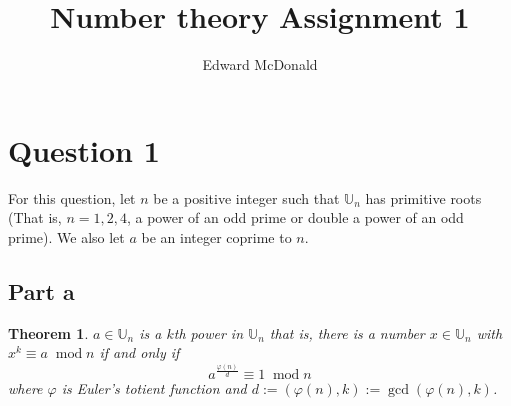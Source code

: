 \documentclass[10pt]{article}
\title{Number theory Assignment 1}
\author{Edward McDonald}
\date{}
\newtheorem{theorem}{Theorem}
\newcommand{\modulo}[1]{\;\operatorname{mod} #1}
\begin{document}
\maketitle{}
    \section*{Question 1}
    For this question, let $n$ be a positive integer such that $\mathbb{U}_n$ has primitive roots 
        (That is, $n = 1,2,4$, a power of an odd prime or double a power of an odd prime).
    We also let $a$ be an integer coprime to $n$.
    \subsection*{Part a}
    \begin{theorem}

        
        $a \in \mathbb{U}_n$ is a $k$th power in $\mathbb{U}_n$ that is, there is
        a number $x \in \mathbb{U}_n$ with $x^k \equiv a\modulo{n}$ if and only if
        \begin{equation*}
            a^{\frac{\varphi(n)}{d}} \equiv 1\modulo{n}
        \end{equation*}
        where $\varphi$ is Euler's totient function and $d := (\varphi(n),k) := \gcd(\varphi(n),k)$.
                
    \end{theorem}
\end{document}
